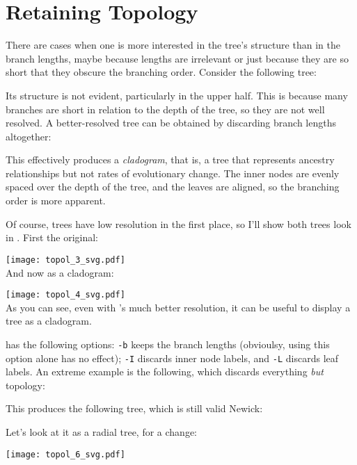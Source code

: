 \section{Retaining Topology}
\label{sct_topology}

There are cases when one is more interested in the tree's structure than in the
branch lengths, maybe because lengths are irrelevant or just because they are
so short that they obscure the branching order. Consider the following tree:
\begin{samepage}

\end{samepage}
Its structure is not evident, particularly in the upper half. This is because
many branches are short in relation to the depth of the tree, so they are not
well resolved. A better-resolved tree can be obtained by discarding branch
lengths altogether:

\begin{samepage}

\end{samepage}
This effectively produces a \emph{cladogram}, that is, a tree that represents
ancestry relationships but not rates of evolutionary change. The inner nodes are
evenly spaced over the depth of the tree, and the leaves are aligned, so the
branching order is more apparent.

Of course, \ascii{} trees have low resolution in the first place, so I'll show
both trees look in \svg. First the original: 

\texttt{[image: topol\_3\_svg.pdf]} \\

\noindent{}And now as a cladogram:

\texttt{[image: topol\_4\_svg.pdf]} \\
As you can see, even with \svg{}'s much better resolution, it can be useful to
display a tree as a cladogram.

\topology{} has the following options: \texttt{-b} keeps the branch lengths (obvioulsy, using this option alone has no effect); \texttt{-I} discards inner node labels, and \texttt{-L} discards leaf labels. An extreme example is the following, which discards everything \emph{but} topology:

This produces the following tree, which is still valid Newick:

Let's look at it as a radial tree, for a change:

\texttt{[image: topol\_6\_svg.pdf]}

